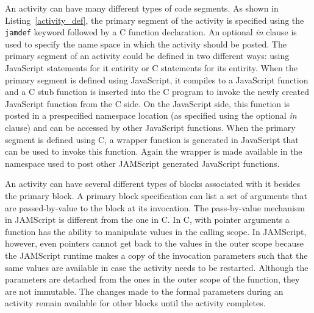 \documentclass[11pt]{article}
\begin{document}
An activity can have many different types of code segments. As shown in
Listing~\ref{activity_def}, the primary segment of the activity is specified
using the {\tt jamdef} keyword followed by a C function declaration. An optional
{\em in} clause is used to specify the name space in which the activity should
be posted. The primary segment of an activity could be defined in two different
ways: using JavaScript statements for it entirity or C statements for its
entirity. When the primary segment is defined using JavaScript, it compiles to a
JavaScript function and a C stub function is inserted into the C program to
invoke the newly created JavaScript function from the C side. On the JavaScript
side, this function is posted in a prespecified namespace location (as specified
using the optional {\em in} clause) and can be accessed by other JavaScript
functions. When the primary segment is defined using C, a wrapper function is
generated in JavaScript that can be used to invoke this function. Again the
wrapper is made available in the namespace used to post other JAMScript
generated JavaScript functions.

%

An activity can have several different types of blocks associated with it
besides the primary block. A primary block specification can list a set of
arguments that are passed-by-value to the block at its invocation. The
pass-by-value mechanism in JAMScript is different from the one in C. In C, with
pointer arguments a function has the ability to manipulate values in the calling
scope. In JAMScript, however, even pointers cannot get back to the values in the
outer scope because the JAMScript runtime makes a copy of the invocation
parameters such that the same values are available in case the activity needs to
be restarted. Although the parameters are detached from the ones in the outer
scope of the function, they are not immutable. The changes made to the formal
parameters during an activity remain available for other blocks until the
activity completes.
\end{document}
